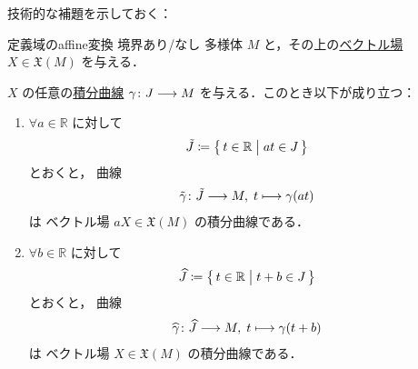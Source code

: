 \documentclass[TQFT_main]{subfiles}
\begin{document}
技術的な補題を示しておく：

\begin{mylem}[label=lem:affine-integral-curve]{定義域のaffine変換}
    境界あり/なし \cinfty 多様体 $M$ と，その上の\hyperref[def:vecf]{\cinfty ベクトル場} $X \in \mathfrak{X}(M)$ を与える．

    $X$ の任意の\hyperref[def:integral-curve]{積分曲線} $\gamma \colon J \longrightarrow M$ を与える．このとき以下が成り立つ：
    \begin{enumerate}
        \item $\forall a \in \mathbb{R}$ に対して
        \begin{align}
            \tilde{J} \coloneqq \bigl\{\, t \in \mathbb{R} \bigm| at \in J \,\bigr\} 
        \end{align}
        とおくと，
        \cinfty 曲線
        \begin{align}
            \tilde{\gamma} \colon \tilde{J} \longrightarrow M,\; t \longmapsto \gamma(at)
        \end{align}
        は \cinfty ベクトル場 $a X \in \mathfrak{X} (M)$ の積分曲線である．
        \item  $\forall b \in \mathbb{R}$ に対して
        \begin{align}
            \widehat{J} \coloneqq \bigl\{\, t \in \mathbb{R} \bigm| t + b \in J \,\bigr\} 
        \end{align}
        とおくと，
        \cinfty 曲線
        \begin{align}
            \widehat{\gamma} \colon \widehat{J} \longrightarrow M,\; t \longmapsto \gamma(t + b)
        \end{align}
        は \cinfty ベクトル場 $X \in \mathfrak{X} (M)$ の積分曲線である．
    \end{enumerate}
\end{mylem}
\end{document}
